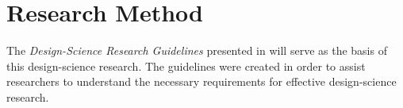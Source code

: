 %
%
\section{Research Method}

%
The \emph{Design-Science Research Guidelines} presented in \cite{Esearch2004} will serve as the basis of this design-science research. The guidelines were created in order to assist researchers to understand the necessary requirements for effective design-science research. 





